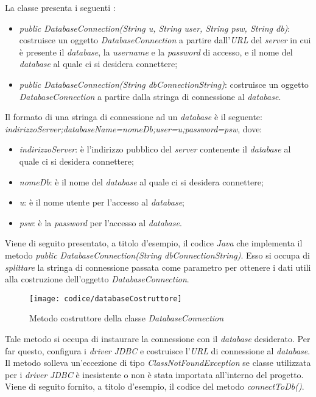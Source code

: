 La classe presenta i seguenti :
\begin{itemize}
	\item \textit{public DatabaseConnection(String u, String user, String psw, String db)}: costruisce un oggetto \textit{DatabaseConnection} a partire dall'\textit{URL} del \textit{server} in cui è presente il \textit{database}, la \textit{username} e la \textit{password} di accesso, e il nome del \textit{database} al quale ci si desidera connettere;
	\item \textit{public DatabaseConnection(String dbConnectionString)}: costruisce un oggetto \textit{DatabaseConnection} a partire dalla stringa di connessione al \textit{database}.
\end{itemize}
Il formato di una stringa di connessione ad un \textit{database} è il seguente: \textit{indirizzoServer;databaseName=nomeDb;user=u;password=psw}, dove:
\begin{itemize}
	\item \textit{indirizzoServer}: è l'indirizzo pubblico del \textit{server} contenente il \textit{database} al quale ci si desidera connettere;
	\item \textit{nomeDb}: è il nome del \textit{database} al quale ci si desidera connettere;
	\item \textit{u}: è il nome utente per l'accesso al \textit{database};
	\item \textit{psw}: è la \textit{password} per l'accesso al \textit{database}.
\end{itemize}
Viene di seguito presentato, a titolo d'esempio, il codice \textit{Java} che implementa il metodo \textit{public DatabaseConnection(String dbConnectionString)}. Esso si occupa di \textit{splittare} la stringa di connessione passata come parametro per ottenere i dati utili alla costruzione dell'oggetto \textit{DatabaseConnection}.

\begin{figure}[!h] 
    \centering 
    \texttt{[image: codice/databaseCostruttore]} 
    \caption{Metodo costruttore della classe \textit{DatabaseConnection}}
\end{figure}


Tale metodo si occupa di instaurare la connessione con il \textit{database} desiderato. Per far questo, configura i \textit{driver} \textit{JDBC} e costruisce l'\textit{URL} di connessione al \textit{database}. Il metodo solleva un'eccezione di tipo \textit{ClassNotFoundException} se classe utilizzata per i \textit{driver} \textit{JDBC} è inesistente o non è stata importata all'interno del progetto. Viene di seguito fornito, a titolo d'esempio, il codice del metodo \textit{connectToDb()}.

